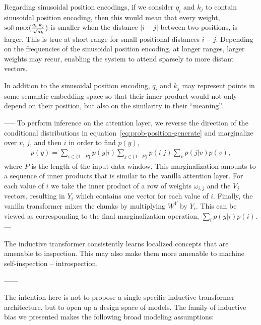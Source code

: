 
Regarding sinusoidal position encodings, if we consider $q_i$ and $k_j$ to contain sinusoidal position encoding, then this would mean that every weight, $\text{softmax}\large(\frac{q_{i} \cdot k_{j}}{\sqrt{d_k}}\large)$ is smaller when the distance $|i-j|$ between two positions, is larger. This is true at short-range for small positional distances $i-j$. Depending on the frequencies of the sinusoidal position encoding, at longer ranges, larger weights may recur, enabling the system to attend sparsely to more distant vectors.

In addition to the sinusoidal position encoding, $q_i$ and $k_j$ may represent points in some semantic embedding space so that their inner product would not only depend on their position, but also on the similarity in their ``meaning''.  


-----
To perform inference on the attention layer, we reverse the direction of the conditional distributions in equation~\ref{eq:prob-position-generate} and marginalize over $v$, $j$, and then $i$ in order to find $p(y)$,
\begin{eqnarray}
    p(y) = \sum_{i \in \{1 \ldots P\}} p(y|i) \sum_{j \in \{1 \ldots P\}} p(i|j) \sum_v p(j|v) p(v), \label{eq:prob-position}
\end{eqnarray}
where $P$ is the length of the input data window.  This marginalization amounts to a sequence of inner products that is similar to the vanilla attention layer.  For each value of $i$ we take the inner product of a row of weights $\omega_{i, j}$ and the $V_j$ vectors, resulting in $Y_i$ which contains one vector for each value of $i$.  Finally, the vanilla transformer mixes the chunks by multiplying $W^Y$ by $Y_i$. This can be viewed as corresponding to the final marginalization operation, $\sum_i p(y|i)p(i)$.
---

The inductive transformer consistently learns localized concepts that are amenable to inspection. This may also make them more amenable to machine self-inspection -- introspection.

------

The intention here is not to propose a single specific inductive transformer architecture, but to open up a design space of models.  The family of inductive bias we presented makes the following broad modeling assumptions:

